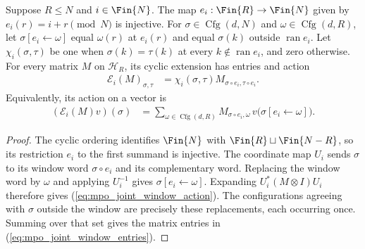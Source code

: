 \begin{theorem}
    \label{thm:mpo_joint_cyclic_embedding}
    Suppose $R\leq N$ and $i\in\Fin{N}$. The map
    $e_i:\Fin{R}\to\Fin{N}$ given by $e_i(r)=i+r\pmod N$ is
    injective. For $\sigma\in\operatorname{Cfg}(d,N)$ and
    $\omega\in\operatorname{Cfg}(d,R)$, let $\sigma[e_i\leftarrow\omega]$
    equal $\omega(r)$ at $e_i(r)$ and equal $\sigma(k)$ outside
    $\operatorname{ran}e_i$. Let $\chi_i(\sigma,\tau)$ be one when
    $\sigma(k)=\tau(k)$ at every $k\notin\operatorname{ran}e_i$,
    and zero otherwise. For every matrix $M$ on $\mathcal H_R$,
    its cyclic extension has entries and action
    \begin{align}
        \mathcal E_i(M)_{\sigma,\tau}
         & =\chi_i(\sigma,\tau)M_{\sigma\circ e_i,\tau\circ e_i}.
        \label{eq:mpo_joint_window_entries}
    \end{align}
    Equivalently, its action on a vector is
    \begin{align}
        (\mathcal E_i(M)v)(\sigma)
         & =\sum_{\omega\in\operatorname{Cfg}(d,R)}
        M_{\sigma\circ e_i,\omega}\,
        v\bigl(\sigma[e_i\leftarrow\omega]\bigr).
        \label{eq:mpo_joint_window_action}
    \end{align}
\end{theorem}
\begin{proof}
    The cyclic ordering identifies $\Fin{N}$ with
    $\Fin{R}\sqcup\Fin{N-R}$, so its restriction $e_i$ to the first
    summand is injective. The coordinate map $U_i$ sends $\sigma$ to
    its window word $\sigma\circ e_i$ and its complementary word.
    Replacing the window word by $\omega$ and applying $U_i^{-1}$ gives
    $\sigma[e_i\leftarrow\omega]$. Expanding $U_i^*(M\otimes I)U_i$
    therefore gives (\ref{eq:mpo_joint_window_action}). The configurations
    agreeing with $\sigma$ outside the window are precisely these
    replacements, each occurring once. Summing over that set gives the
    matrix entries in (\ref{eq:mpo_joint_window_entries}).
\end{proof}

